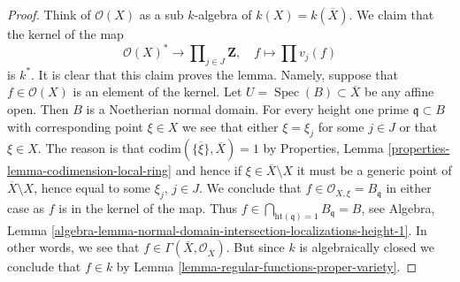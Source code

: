 \documentclass[10pt,a4paper]{amsart}
\theoremstyle{plain}
\theoremstyle{definition}
\theoremstyle{remark}
\numberwithin{equation}{subsection}
\def\Spec{\mathop{\mathrm{Spec}}}
\begin{document}
\begin{proof}
\medskip\noindent
Think of $\mathcal{O}(X)$ as a sub $k$-algebra of $k(X) = k(\overline{X})$.
We claim that the kernel of the map
$$
\mathcal{O}(X)^* \longrightarrow
\prod\nolimits_{j \in J} \mathbf{Z},
\quad
f \longmapsto \prod v_j(f)
$$
is $k^*$. It is clear that this claim proves the lemma.
Namely, suppose that $f \in \mathcal{O}(X)$ is an element of the kernel.
Let $U = \Spec(B) \subset \overline{X}$ be any affine open.
Then $B$ is a Noetherian normal domain.
For every height one prime $\mathfrak q \subset B$ with corresponding
point $\xi \in X$ we see that either $\xi = \xi_j$ for some $j \in J$
or that $\xi \in X$. The reason is that
$\text{codim}(\overline{\{\xi\}}, \overline{X}) = 1$ by
Properties, Lemma \ref{properties-lemma-codimension-local-ring}
and hence if $\xi \in \overline{X} \setminus X$ it must be a
generic point of $\overline{X} \setminus X$, hence equal to some
$\xi_j$, $j \in J$.
We conclude that $f \in \mathcal{O}_{X, \xi} = B_{\mathfrak q}$
in either case as $f$ is in the kernel of the map. Thus
$f \in \bigcap_{\text{ht}(\mathfrak q) = 1} B_{\mathfrak q} = B$, see
Algebra, Lemma
\ref{algebra-lemma-normal-domain-intersection-localizations-height-1}.
In other words, we see that
$f \in \Gamma(\overline{X}, \mathcal{O}_{\overline{X}})$.
But since $k$ is algebraically closed we conclude that
$f \in k$ by
Lemma \ref{lemma-regular-functions-proper-variety}.
\end{proof}
\end{document}
